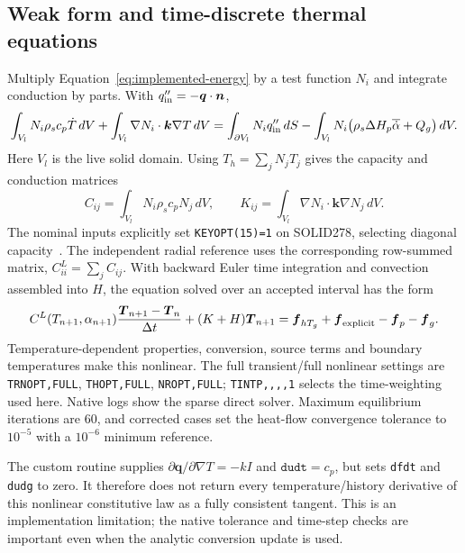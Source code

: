 \documentclass[oneside,openany]{amsdtx}
\begin{document}
\subsection{Weak form and time-discrete thermal equations}
Multiply Equation~\eqref{eq:implemented-energy} by a test function $N_i$ and integrate conduction by parts. With $q_{\rm in}''=-\boldsymbol q\cdot\boldsymbol n$,
\begin{equation}
 \int_{V_l}N_i\rho_sc_p\dot T\,dV+
 \int_{V_l}\nabla N_i\cdot\boldsymbol k\nabla T\,dV
 =\int_{\partial V_l}N_iq_{\rm in}''\,dS
 -\int_{V_l}N_i\bigl(\rho_s\Delta H_p\overline{\dot\alpha}+Q_g\bigr)\,dV.
\end{equation}
Here $V_l$ is the live solid domain. Using $T_h=\sum_jN_jT_j$ gives the capacity and conduction matrices
\begin{equation}
 C_{ij}=\int_{V_l}N_i\rho_sc_pN_j\,dV,\qquad
 K_{ij}=\int_{V_l}\nabla N_i\cdot\boldsymbol k\nabla N_j\,dV.
\end{equation}
The nominal inputs explicitly set \texttt{KEYOPT(15)=1} on SOLID278, selecting diagonal capacity~\cite{ansyssolid}. The independent radial reference uses the corresponding row-summed matrix, $C^L_{ii}=\sum_jC_{ij}$. With backward Euler time integration and convection assembled into $H$, the equation solved over an accepted interval has the form
\begin{equation}
 C^L(T_{n+1},\alpha_{n+1})\frac{\boldsymbol T_{n+1}-\boldsymbol T_n}{\Delta t}
 +(K+H)\boldsymbol T_{n+1}
 =\boldsymbol f_{hT_g}+\boldsymbol f_{\rm explicit}-\boldsymbol f_p-\boldsymbol f_g.
\end{equation}
Temperature-dependent properties, conversion, source terms and boundary temperatures make this nonlinear. The full transient/full nonlinear settings are \texttt{TRNOPT,FULL}, \texttt{THOPT,FULL}, \texttt{NROPT,FULL}; \texttt{TINTP,,,,1} selects the time-weighting used here. Native logs show the sparse direct solver. Maximum equilibrium iterations are 60, and corrected cases set the heat-flow convergence tolerance to $10^{-5}$ with a $10^{-6}$ minimum reference.

The custom routine supplies $\partial\boldsymbol q/\partial\nabla T=-kI$ and $\texttt{dudt}=c_p$, but sets \texttt{dfdt} and \texttt{dudg} to zero. It therefore does not return every temperature/history derivative of this nonlinear constitutive law as a fully consistent tangent. This is an implementation limitation; the native tolerance and time-step checks are important even when the analytic conversion update is used.
\end{document}
